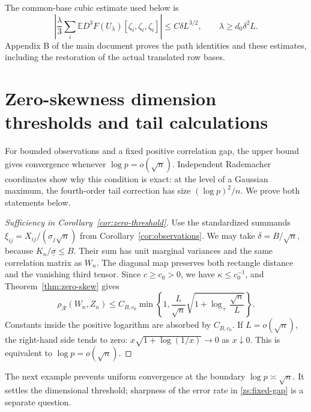 \documentclass[11pt,a4paper]{article}
\theoremstyle{remark}
\newcommand{\E}{\mathbb E}
\newcommand{\rh}{\rho_{\mathcal R}}
\begin{document}
The common-base cubic estimate used below is
\begin{equation}
\left|\frac\lambda3\sum_i\E D^3F(U_\lambda)
[\zeta_i,\zeta_i,\zeta_i]\right|\le C\delta L^{3/2},
\qquad \lambda\ge d_0\delta^2L.
\label{an:cubic-bound}
\end{equation}
Appendix B of the main document proves the path identities and these
estimates, including the restoration of the actual translated row bases.


\section{Zero-skewness dimension thresholds and tail calculations}\label{zs:section}

For bounded observations and a fixed positive correlation gap, the
upper bound gives convergence whenever \(\log p=o(\sqrt n)\).
Independent Rademacher coordinates show why this condition is exact:
at the level of a Gaussian maximum, the fourth-order tail correction
has size \((\log p)^2/n\). We prove both statements below.

\begin{proof}[Sufficiency in Corollary~\ref{cor:zero-threshold}]
Use the standardized summands
\(\xi_{ij}=X_{ij}/(\sigma_j\sqrt n)\) from
Corollary~\ref{cor:observations}. We may take \(\delta=B/\sqrt n\),
because \(K_n/\underline\sigma\le B\). Their sum has unit marginal
variances and the same correlation matrix as \(W_n\). The diagonal
map preserves both rectangle distance and the vanishing third tensor.
Since \(c\ge c_0>0\), we have \(\kappa\le c_0^{-1}\), and
Theorem~\ref{thm:zero-skew} gives
\begin{equation}
 \rh(W_n,Z_n)\le C_{B,c_0}\min\left\{1,
 \frac L{\sqrt n}
 \sqrt{1+\log_+\frac{\sqrt n}{L}}\right\}.
 \label{zs:fixed-gap}
\end{equation}
Constants inside the positive logarithm are absorbed by
\(C_{B,c_0}\). If \(L=o(\sqrt n)\), the right-hand side tends to zero:
\(x\sqrt{1+\log(1/x)}\to0\) as \(x\downarrow0\).
This is equivalent to \(\log p=o(\sqrt n)\).
\end{proof}

The next example prevents uniform convergence at the boundary
\(\log p\asymp\sqrt n\). It settles the dimensional threshold;
sharpness of the error rate in \eqref{zs:fixed-gap} is a separate
question.
\end{document}
